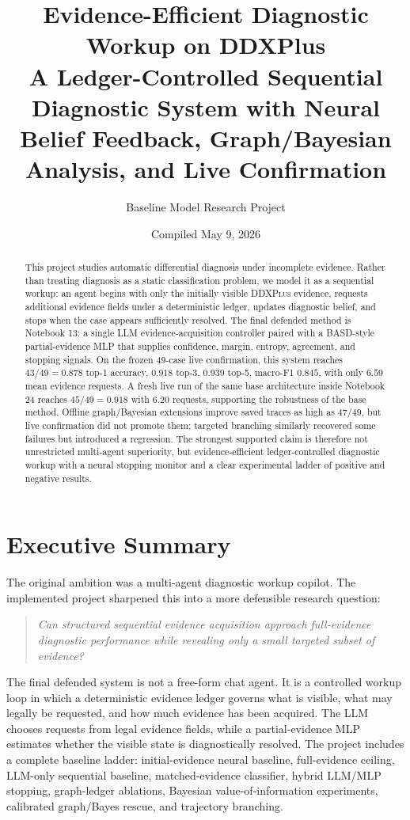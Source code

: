 \documentclass[11pt]{article}
\title{\textbf{Evidence-Efficient Diagnostic Workup on DDXPlus}\\
\large A Ledger-Controlled Sequential Diagnostic System with Neural Belief Feedback, Graph/Bayesian Analysis, and Live Confirmation}
\author{Baseline Model Research Project}
\date{Compiled May 9, 2026}
\newcommand{\ddx}{\textsc{DDXPlus}}
\newcommand{\mlp}{\textsc{MLP}}
\newcommand{\llm}{\textsc{LLM}}
\begin{document}
\maketitle

\begin{abstract}
This project studies automatic differential diagnosis under incomplete evidence. Rather than treating diagnosis as a static classification problem, we model it as a sequential workup: an agent begins with only the initially visible \ddx{} evidence, requests additional evidence fields under a deterministic ledger, updates diagnostic belief, and stops when the case appears sufficiently resolved. The final defended method is Notebook 13: a single \llm{} evidence-acquisition controller paired with a BASD-style partial-evidence \mlp{} that supplies confidence, margin, entropy, agreement, and stopping signals. On the frozen 49-case live confirmation, this system reaches $43/49 = 0.878$ top-1 accuracy, $0.918$ top-3, $0.939$ top-5, macro-F1 $0.845$, with only $6.59$ mean evidence requests. A fresh live run of the same base architecture inside Notebook 24 reaches $45/49 = 0.918$ with $6.20$ requests, supporting the robustness of the base method. Offline graph/Bayesian extensions improve saved traces as high as $47/49$, but live confirmation did not promote them; targeted branching similarly recovered some failures but introduced a regression. The strongest supported claim is therefore not unrestricted multi-agent superiority, but evidence-efficient ledger-controlled diagnostic workup with a neural stopping monitor and a clear experimental ladder of positive and negative results.
\end{abstract}

\tableofcontents
\newpage

\section{Executive Summary}

The original ambition was a multi-agent diagnostic workup copilot. The implemented project sharpened this into a more defensible research question:
\begin{quote}
\emph{Can structured sequential evidence acquisition approach full-evidence diagnostic performance while revealing only a small targeted subset of evidence?}
\end{quote}

The final defended system is not a free-form chat agent. It is a controlled workup loop in which a deterministic evidence ledger governs what is visible, what may legally be requested, and how much evidence has been acquired. The \llm{} chooses requests from legal evidence fields, while a partial-evidence \mlp{} estimates whether the visible state is diagnostically resolved. The project includes a complete baseline ladder: initial-evidence neural baseline, full-evidence ceiling, \llm{}-only sequential baseline, matched-evidence classifier, hybrid \llm{}/\mlp{} stopping, graph-ledger ablations, Bayesian value-of-information experiments, calibrated graph/Bayes rescue, and trajectory branching.
\end{document}
